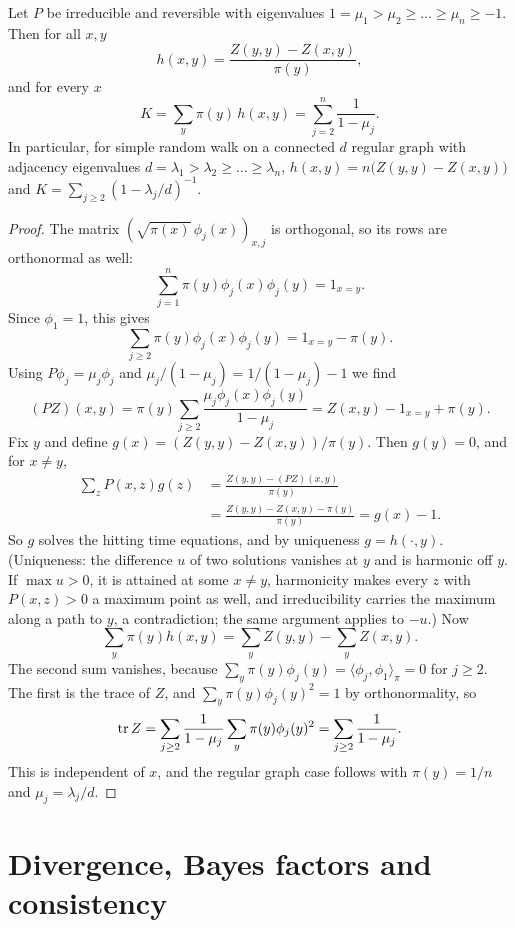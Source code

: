 \begin{theorem}\label{thm:A:kemeny}
Let $P$ be irreducible and reversible with eigenvalues $1=\mu_1>\mu_2\ge\dots\ge\mu_n\ge-1$. Then for all $x,y$
\[
h(x,y)=\frac{Z(y,y)-Z(x,y)}{\pi(y)},
\]
and for every $x$
\[
K=\sum_y\pi(y)\,h(x,y)=\sum_{j=2}^n\frac{1}{1-\mu_j}.
\]
In particular, for simple random walk on a connected $d$ regular graph with adjacency eigenvalues $d=\lambda_1>\lambda_2\ge\dots\ge\lambda_n$, $h(x,y)=n\bigl(Z(y,y)-Z(x,y)\bigr)$ and $K=\sum_{j\ge2}(1-\lambda_j/d)^{-1}$.
\end{theorem}

\begin{proof}
The matrix $(\sqrt{\pi(x)}\,\phi_j(x))_{x,j}$ is orthogonal, so its rows are orthonormal as well:
\[
\sum_{j=1}^n\pi(y)\phi_j(x)\phi_j(y)=1_{x=y}.
\]
Since $\phi_1=1$, this gives
\[
\sum_{j\ge2}\pi(y)\phi_j(x)\phi_j(y)=1_{x=y}-\pi(y).
\]
Using $P\phi_j=\mu_j\phi_j$ and $\mu_j/(1-\mu_j)=1/(1-\mu_j)-1$ we find
\[
(PZ)(x,y)=\pi(y)\sum_{j\ge2}\frac{\mu_j\phi_j(x)\phi_j(y)}{1-\mu_j}=Z(x,y)-1_{x=y}+\pi(y).
\]
Fix $y$ and define $g(x)=(Z(y,y)-Z(x,y))/\pi(y)$. Then $g(y)=0$, and for $x\ne y$,
\begin{align*}
\sum_zP(x,z)g(z)&=\frac{Z(y,y)-(PZ)(x,y)}{\pi(y)}\\
&=\frac{Z(y,y)-Z(x,y)-\pi(y)}{\pi(y)}=g(x)-1.
\end{align*}
So $g$ solves the hitting time equations, and by uniqueness $g=h(\cdot,y)$. (Uniqueness: the difference $u$ of two solutions vanishes at $y$ and is harmonic off $y$. If $\max u>0$, it is attained at some $x\ne y$, harmonicity makes every $z$ with $P(x,z)>0$ a maximum point as well, and irreducibility carries the maximum along a path to $y$, a contradiction; the same argument applies to $-u$.) Now
\[
\sum_y\pi(y)h(x,y)=\sum_yZ(y,y)-\sum_yZ(x,y).
\]
The second sum vanishes, because $\sum_y\pi(y)\phi_j(y)=\langle\phi_j,\phi_1\rangle_\pi=0$ for $j\ge2$. The first is the trace of $Z$, and $\sum_y\pi(y)\phi_j(y)^2=1$ by orthonormality, so
\[
\operatorname{tr} Z=\sum_{j\ge2}\frac{1}{1-\mu_j}\sum_y\pi(y)\phi_j(y)^2=\sum_{j\ge2}\frac{1}{1-\mu_j}.
\]
This is independent of $x$, and the regular graph case follows with $\pi(y)=1/n$ and $\mu_j=\lambda_j/d$.
\end{proof}

\section{Divergence, Bayes factors and consistency}

